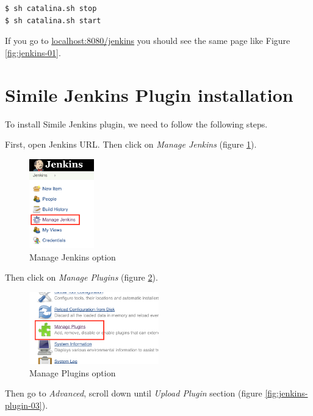 \begin{verbatim}
$ sh catalina.sh stop
$ sh catalina.sh start
\end{verbatim}

If you go to \url{localhost:8080/jenkins} you should see the same page like Figure \ref{fig:jenkins-01}.

\section{Simile Jenkins Plugin installation}
To install Simile Jenkins plugin, we need to follow the following steps.

First, open Jenkins URL. Then click on \textit{Manage Jenkins} (figure \ref{fig:jenkins-plugin-01}).

\begin{figure}[H]
	\centering
    \includegraphics[width=0.25\textwidth]{grafiken/jenkins-plugin-01}
    \caption{Manage Jenkins option}
    \label{fig:jenkins-plugin-01}
\end{figure}

Then click on \textit{Manage Plugins} (figure \ref{fig:jenkins-plugin-02}).

\begin{figure}[H]
	\centering
    \includegraphics[width=0.5\textwidth]{grafiken/jenkins-plugin-02}
    \caption{Manage Plugins option}
    \label{fig:jenkins-plugin-02}
\end{figure}

Then go to \textit{Advanced}, scroll down until \textit{Upload Plugin} section (figure \ref{fig:jenkins-plugin-03}).

